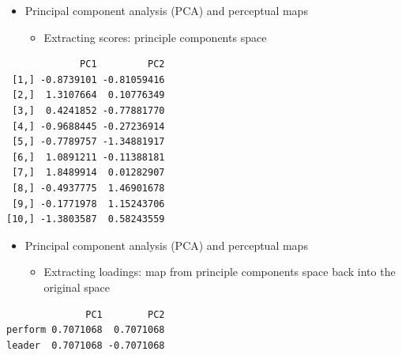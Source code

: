\documentclass[
  ignorenonframetext,
]{beamer}
\newenvironment{Shaded}{\begin{snugshade}}{\end{snugshade}}
\newcommand{\NormalTok}[1]{\textcolor[rgb]{0.00,0.23,0.31}{#1}}
\newcommand{\OtherTok}[1]{\textcolor[rgb]{0.00,0.23,0.31}{#1}}
\newcommand{\SpecialCharTok}[1]{\textcolor[rgb]{0.37,0.37,0.37}{#1}}
\providecommand{\tightlist}{%
  \setlength{\itemsep}{0pt}\setlength{\parskip}{0pt}}\usepackage{longtable,booktabs,array}
\begin{document}
\begin{frame}[fragile]{}
\label{section-31}
\begin{itemize}
\item
  Principal component analysis (PCA) and perceptual maps

  \begin{itemize}
  \tightlist
  \item
    Extracting scores: principle components space
  \end{itemize}
\end{itemize}

\tiny

\begin{Shaded}
\end{Shaded}

\begin{verbatim}
             PC1         PC2
 [1,] -0.8739101 -0.81059416
 [2,]  1.3107664  0.10776349
 [3,]  0.4241852 -0.77881770
 [4,] -0.9688445 -0.27236914
 [5,] -0.7789757 -1.34881917
 [6,]  1.0891211 -0.11388181
 [7,]  1.8489914  0.01282907
 [8,] -0.4937775  1.46901678
 [9,] -0.1771978  1.15243706
[10,] -1.3803587  0.58243559
\end{verbatim}
\end{frame}

\begin{frame}[fragile]{}
\label{section-32}
\begin{itemize}
\item
  Principal component analysis (PCA) and perceptual maps

  \begin{itemize}
  \tightlist
  \item
    Extracting loadings: map from principle components space back into
    the original space
  \end{itemize}
\end{itemize}

\tiny

\begin{Shaded}
\end{Shaded}

\begin{verbatim}
              PC1        PC2
perform 0.7071068  0.7071068
leader  0.7071068 -0.7071068
\end{verbatim}
\end{frame}
\end{document}
